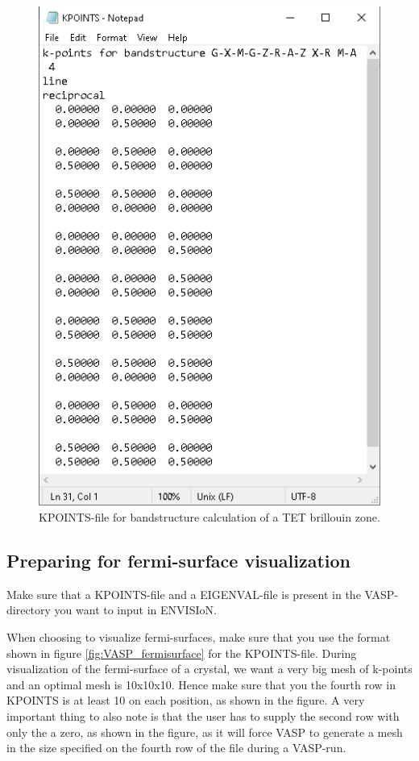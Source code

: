 \begin{figure}[H]
    \centering
    \includegraphics[scale = 0.53]{Images/usermanual_band_TET.png}
    \caption{KPOINTS-file for bandstructure calculation of a TET brillouin zone.}
    \label{fig:VASP_band}
\end{figure}

\subsection{Preparing for fermi-surface visualization}

Make sure that a KPOINTS-file and a EIGENVAL-file is present in the VASP-directory you want to input in ENVISIoN. 

When choosing to visualize fermi-surfaces, make sure that you use the format shown in figure \ref{fig:VASP_fermisurface} for the KPOINTS-file. During visualization of the fermi-surface of a crystal, we want a very big mesh of k-points and an optimal mesh is 10x10x10. Hence make sure that you the fourth row in KPOINTS is at least 10 on each position, as shown in the figure. A very important thing to also note is that the user has to supply the second row with only the a zero, as shown in the figure, as it will force VASP to generate a mesh in the size specified on the fourth row of the file during a VASP-run.


